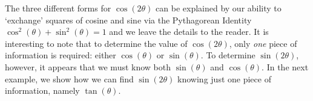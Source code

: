 \smallskip

The three different forms for $\cos(2\theta)$ can be explained by our ability to `exchange' squares of cosine and sine via the Pythagorean Identity $\cos^{2}(\theta) + \sin^{2}(\theta) = 1$ and we leave the details to the reader.  It is interesting to note that to determine the value of $\cos(2\theta)$, only \textit{one} piece of information is required: either $\cos(\theta)$ or $\sin(\theta)$.  To determine $\sin(2\theta)$, however, it appears that we must know both $\sin(\theta)$ and $\cos(\theta)$.  In the next example, we show how we can find $\sin(2\theta)$ knowing just one piece of information, namely $\tan(\theta)$.

\pagebreak

